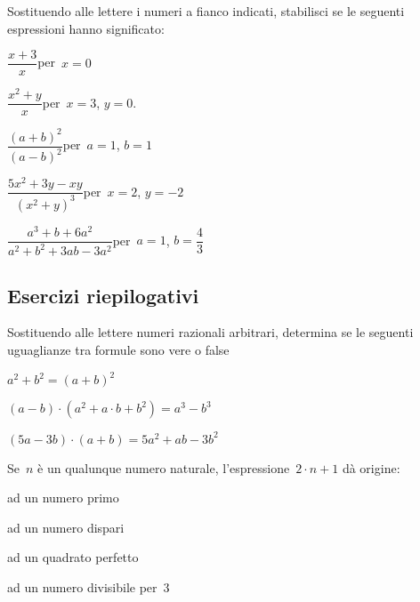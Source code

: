 \begin{esercizio}[\Ast]
 \label{ese:9.24}%
Sostituendo alle lettere i numeri a fianco indicati, stabilisci se le
seguenti espressioni hanno significato:
\TabPositions{8cm}
\begin{enumeratea}
\item $\dfrac{x+3}{x}$\quad per~$x=0$ \tab\boxSi\quad\boxNo
\item $\dfrac{x^{2}+y}{x}$\quad per~$x=3$, $y=0.$ \tab\boxSi\quad\boxNo
\item $\dfrac{(a+b)^{2}}{(a-b)^{2}}$\quad per~$a=1$, $b=1$ \tab\boxSi\quad\boxNo
\item $\dfrac{5x^{2}+3y-xy}{(x^{2}+y)^{3}}$\quad per~$x=2$, $y=-2$ \tab\boxSi\quad\boxNo
\item $\dfrac{a^{3}+b+6a^{2}}{a^{2}+b^{2}+3ab-3a^{2}}$\quad per~$a=1$, $b=\dfrac{4}{3}$ \tab\boxSi\quad\boxNo
\end{enumeratea}
\end{esercizio}

\subsection{Esercizi riepilogativi}

\begin{esercizio}
 \label{ese:9.25} %
 Sostituendo alle lettere numeri razionali
arbitrari, determina se le seguenti uguaglianze tra formule sono
vere o false
\TabPositions{8cm}
\begin{enumeratea}
 \item $a^{2}+b^{2}=(a+b)^{2}$ \tab\boxV\quad\boxF
 \item $(a-b)\cdot (a^{2}+a\cdot b+b^{2})=a^{3}-b^{3}$ \tab\boxV\quad\boxF
 \item $(5a-3b)\cdot (a+b)=5a^{2}+ab-3b^{2}$ \tab\boxV\quad\boxF
\end{enumeratea}
\end{esercizio}

\begin{esercizio}
 \label{ese:9.26} %
 Se~$n$ è un qualunque numero naturale,
l'espressione~$2\cdot n+1$ dà origine:
\begin{multicols}{2}
\boxA\quad ad un numero primo

\boxB\quad ad un numero dispari

\boxC\quad ad un quadrato perfetto

\boxD\quad ad un numero divisibile per~3
\end{multicols}
\end{esercizio}

